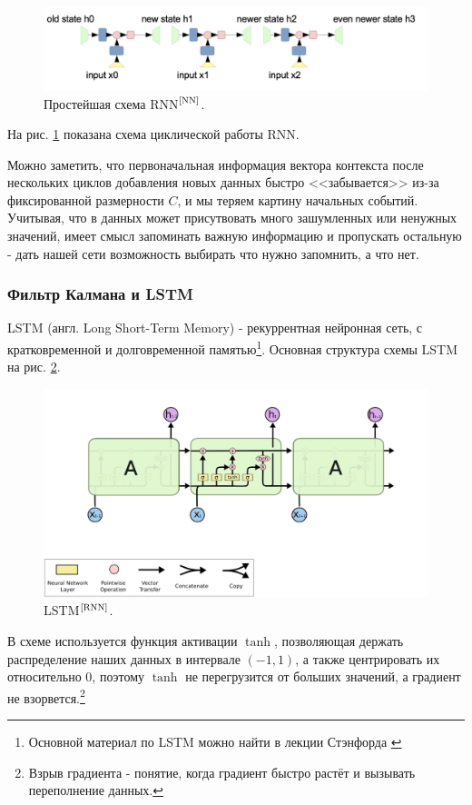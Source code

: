 \documentclass[a4paper,11pt]{article} %
\begin{document}
\begin{figure}[h!]
\begin{center}
\includegraphics[width=1\textwidth]{images/RNN2}
\end{center}
\caption{Простейшая схема RNN$^\text{\cite{NN}}$.} \label{RNN2}
\end{figure}

На  рис. \ref{RNN2} показана схема циклической работы RNN.

Можно заметить, что первоначальная информация вектора контекста после нескольких циклов добавления новых данных быстро <<забывается>> из-за фиксированной размерности $C$, и мы теряем картину начальных событий.  Учитывая, что в данных может присутвовать много зашумленных или ненужных значений,  имеет смысл запоминать важную информацию и пропускать остальную - дать нашей сети  возможность выбирать что нужно запомнить, а что  нет.

\newpage
\subsubsection{Фильтр Калмана и LSTM}

LSTM (англ.  Long Short-Term Memory) - рекуррентная нейронная сеть, с кратковременной и долговременной памятью\footnote{Основной материал по LSTM можно найти в лекции Стэнфорда \cite{RNN}}.  Основная структура схемы LSTM на  рис.  \ref{RNN3}.

\begin{figure}[h!]
\begin{center}
\includegraphics[width=1\textwidth]{images/RNN3}
\end{center}
\caption{LSTM$^\text{\cite{RNN}}$.} \label{RNN3}
\end{figure}
В схеме используется функция активации $\tanh$,  позволяющая держать распределение наших данных в интервале $(-1,1)$,  а также центрировать их относительно $0$,  поэтому $\tanh$ не перегрузится от больших значений, а градиент не взорвется.\footnote{Взрыв градиента - понятие, когда градиент быстро растёт и вызывать переполнение данных.} 
\end{document}
